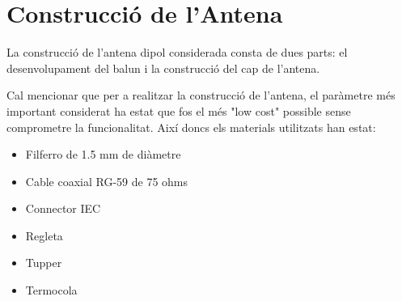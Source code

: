 \section{Construcció de l'Antena}

La construcció de l'antena dipol considerada consta de dues parts: el desenvolupament del balun i la construcció del cap de l'antena.

Cal mencionar que per a realitzar la construcció de l'antena, el paràmetre més important considerat ha estat que fos el més "low cost" possible sense comprometre la funcionalitat. Així doncs els materials utilitzats han estat:

\begin{itemize}
\item Filferro de 1.5 mm de diàmetre
\item Cable coaxial RG-59 de 75 ohms
\item Connector IEC 
\item Regleta 
\item Tupper
\item Termocola
\end{itemize}

